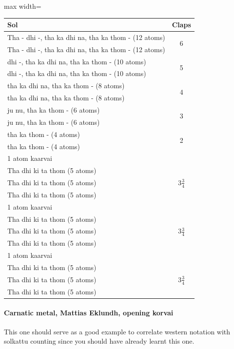 \begin{center}
\begin{adjustbox}{max width=\textwidth}
\begin{tabular}{l c}
\toprule
Sol & Claps\\
\midrule
Tha - dhi -, tha ka dhi na, tha ka thom - (12 atoms) & \multirow{2}{*}{6}\\
Tha - dhi -, tha ka dhi na, tha ka thom - (12 atoms) & \\
\midrule
dhi -, tha ka dhi na, tha ka thom - (10 atoms) & \multirow{2}{*}{5}\\
dhi -, tha ka dhi na, tha ka thom - (10 atoms) & \\
\midrule
tha ka dhi na, tha ka thom - (8 atoms) & \multirow{2}{*}{4}\\
tha ka dhi na, tha ka thom - (8 atoms) & \\
\midrule
ju nu, tha ka thom - (6 atoms) & \multirow{2}{*}{3}\\
ju nu, tha ka thom - (6 atoms) & \\
\midrule
tha ka thom - (4 atoms) & \multirow{2}{*}{2}\\
tha ka thom - (4 atoms) & \\
1 atom kaarvai          & \\
\midrule
Tha dhi ki ta thom (5 atoms) & \multirow{3}{*}{$3\frac{3}{4}$}\\
Tha dhi ki ta thom (5 atoms) & \\
Tha dhi ki ta thom (5 atoms) & \\
1 atom kaarvai               & \\
\midrule
Tha dhi ki ta thom (5 atoms) & \multirow{3}{*}{$3\frac{3}{4}$}\\
Tha dhi ki ta thom (5 atoms) & \\
Tha dhi ki ta thom (5 atoms) & \\
1 atom kaarvai               & \\
\midrule
Tha dhi ki ta thom (5 atoms) & \multirow{3}{*}{$3\frac{3}{4}$}\\
Tha dhi ki ta thom (5 atoms) & \\
Tha dhi ki ta thom (5 atoms) & \\
\bottomrule
\end{tabular}
\end{adjustbox}
\end{center}

\paragraph{Carnatic metal, Mattias Eklundh, opening korvai}
This one should serve as a good example to correlate western notation with solkattu
counting since you should have already learnt this one.

